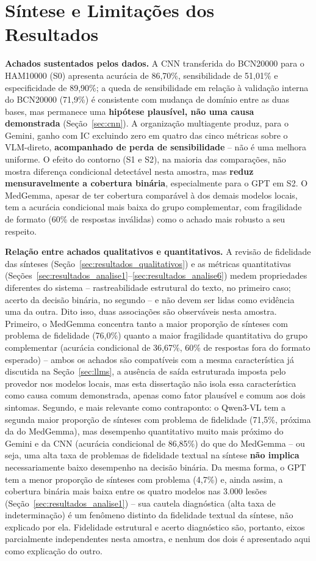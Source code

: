 \section{Síntese e Limitações dos Resultados}
\label{sec:sintese_resultados}

\textbf{Achados sustentados pelos dados.} A CNN transferida do BCN20000 para o HAM10000 (S0) apresenta acurácia de 86,70\%, sensibilidade de 51,01\% e especificidade de 89,90\%; a queda de sensibilidade em relação à validação interna do BCN20000 (71,9\%) é consistente com mudança de domínio entre as duas bases, mas permanece uma \textbf{hipótese plausível, não uma causa demonstrada} (Seção~\ref{sec:cnn}). A organização multiagente produz, para o Gemini, ganho com IC excluindo zero em quatro das cinco métricas sobre o VLM-direto, \textbf{acompanhado de perda de sensibilidade} -- não é uma melhora uniforme. O efeito do contorno (S1 e S2), na maioria das comparações, não mostra diferença condicional detectável nesta amostra, mas \textbf{reduz mensuravelmente a cobertura binária}, especialmente para o GPT em S2. O MedGemma, apesar de ter cobertura comparável à dos demais modelos locais, tem a acurácia condicional mais baixa do grupo complementar, com fragilidade de formato (60\% de respostas inválidas) como o achado mais robusto a seu respeito.

\textbf{Relação entre achados qualitativos e quantitativos.} A revisão de fidelidade das sínteses (Seção~\ref{sec:resultados_qualitativos}) e as métricas quantitativas (Seções~\ref{sec:resultados_analise1}--\ref{sec:resultados_analise6}) medem propriedades diferentes do sistema -- rastreabilidade estrutural do texto, no primeiro caso; acerto da decisão binária, no segundo -- e não devem ser lidas como evidência uma da outra. Dito isso, duas associações são observáveis nesta amostra. Primeiro, o MedGemma concentra tanto a maior proporção de sínteses com problema de fidelidade (76,0\%) quanto a maior fragilidade quantitativa do grupo complementar (acurácia condicional de 36,67\%, 60\% de respostas fora do formato esperado) -- ambos os achados são compatíveis com a mesma característica já discutida na Seção~\ref{sec:llms}, a ausência de saída estruturada imposta pelo provedor nos modelos locais, mas esta dissertação não isola essa característica como causa comum demonstrada, apenas como fator plausível e comum aos dois sintomas. Segundo, e mais relevante como contraponto: o Qwen3-VL tem a segunda maior proporção de sínteses com problema de fidelidade (71,5\%, próxima da do MedGemma), mas desempenho quantitativo muito mais próximo do Gemini e da CNN (acurácia condicional de 86,85\%) do que do MedGemma -- ou seja, uma alta taxa de problemas de fidelidade textual na síntese \textbf{não implica} necessariamente baixo desempenho na decisão binária. Da mesma forma, o GPT tem a menor proporção de sínteses com problema (4,7\%) e, ainda assim, a cobertura binária mais baixa entre os quatro modelos nas 3.000 lesões (Seção~\ref{sec:resultados_analise1}) -- sua cautela diagnóstica (alta taxa de indeterminação) é um fenômeno distinto da fidelidade textual da síntese, não explicado por ela. Fidelidade estrutural e acerto diagnóstico são, portanto, eixos parcialmente independentes nesta amostra, e nenhum dos dois é apresentado aqui como explicação do outro.


